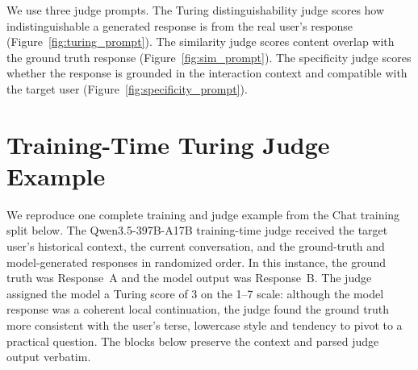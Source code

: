 \documentclass[11pt]{article}
\begin{document}
We use three judge prompts. The Turing distinguishability judge scores how indistinguishable a generated response is from the real user's response (Figure~\ref{fig:turing_prompt}). The similarity judge scores content overlap with the ground truth response (Figure~\ref{fig:sim_prompt}). The specificity judge scores whether the response is grounded in the interaction context and compatible with the target user (Figure~\ref{fig:specificity_prompt}).






\clearpage
\onecolumn
\section{Training-Time Turing Judge Example}
\label{app:training-judge-example}

We reproduce one complete training and judge example from the Chat training split below. The Qwen3.5-397B-A17B training-time judge received the target user's historical context, the current conversation, and the ground-truth and model-generated responses in randomized order. In this instance, the ground truth was Response~A and the model output was Response~B. The judge assigned the model a Turing score of 3 on the 1--7 scale: although the model response was a coherent local continuation, the judge found the ground truth more consistent with the user's terse, lowercase style and tendency to pivot to a practical question. The blocks below preserve the context and parsed judge output verbatim.
\end{document}
